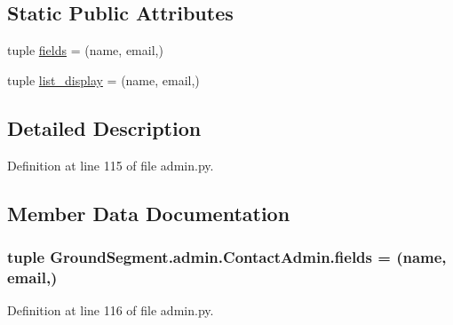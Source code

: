 \subsection*{Static Public Attributes}
\begin{DoxyCompactItemize}
\item 
tuple \hyperlink{class_ground_segment_1_1admin_1_1_contact_admin_a7b3018f6da7c9eced691fae7a6229a70}{fields} = (\textquotesingle{}name\textquotesingle{}, \textquotesingle{}email\textquotesingle{},)
\item 
tuple \hyperlink{class_ground_segment_1_1admin_1_1_contact_admin_a6dda75f284db38fa53b8b9d4f9116459}{list\+\_\+display} = (\textquotesingle{}name\textquotesingle{}, \textquotesingle{}email\textquotesingle{},)
\end{DoxyCompactItemize}


\subsection{Detailed Description}


Definition at line 115 of file admin.\+py.



\subsection{Member Data Documentation}
\hypertarget{class_ground_segment_1_1admin_1_1_contact_admin_a7b3018f6da7c9eced691fae7a6229a70}{}
\subsubsection[{fields}]{\setlength{\rightskip}{0pt plus 5cm}tuple Ground\+Segment.\+admin.\+Contact\+Admin.\+fields = (\textquotesingle{}name\textquotesingle{}, \textquotesingle{}email\textquotesingle{},)\hspace{0.3cm}{\ttfamily [static]}}\label{class_ground_segment_1_1admin_1_1_contact_admin_a7b3018f6da7c9eced691fae7a6229a70}


Definition at line 116 of file admin.\+py.

\hypertarget{class_ground_segment_1_1admin_1_1_contact_admin_a6dda75f284db38fa53b8b9d4f9116459}{}
